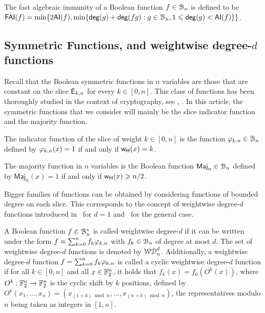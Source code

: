 \documentclass{llncs}
\begin{document}
\begin{definition}\label{def:FAI}
	The fast algebraic immunity of a Boolean function $f\in \mathcal{B}_{n}$ is defined to be $\mathsf{FAI}(f)=\min \{ 2 \mathsf{AI}(f), \min\{\mathsf{deg}(g)+ \mathsf{deg}(fg):g\in\mathcal{B}_n,1\leqslant\mathsf{deg}(g)<\mathsf{AI}(f)\}\}$.
\end{definition}

\subsection{Symmetric Functions, \hwbf{} and weightwise degree-$d$ functions}

Recall that the Boolean symmetric functions in $n$ variables are those that are constant on the slice $\mathsf{E}_{k,n}$ for every $k\in [0,n]$.  This class of functions has been thoroughly studied in the context of cryptography, see \eg, \cite{IEEE:Carlet04,IEEE:CanVid05,INDO:BraPre05,DM:SarMai07,IEEE:QFLW09,IEEE:CheLu11,Latin:Meaux19,CCDS:Meaux21,IEEE:CarMea21}. In this article, the symmetric functions that we consider will mainly be the slice indicator function and the majority function.

\begin{definition}\label{def:slice}
	The indicator function of the slice of weight $k\in[0,n]$ is the function $\varphi_{k,n}\in\mathcal{B}_n$ defined by $\varphi_{k,n}(x)=1$ if and only if $\mathsf{w_H}(x)=k$.
\end{definition}

\begin{definition}\label{def:maj}
    The majority function in $n$ variables is the Boolean function $\mathsf{Maj}_n\in\mathcal{B}_n$ defined by $\mathsf{Maj}_n(x)=1$ if and only if $\mathsf{w_H}(x)\geqslant n/2$.
\end{definition}

Bigger families of functions can be obtained by considering functions of bounded degree on each slice. This corresponds to the concept of weightwise degree-$d$ functions introduced in~\cite{DAM:GinMea22} for $d=1$ and~\cite{DAM:MeaOza24} for the general case. 

\begin{definition}\label{def:wwdegd}
    A Boolean function $f\in\mathcal{B}_n^*$ is called weightwise degree-$d$ if it can be written under the form $f=\sum_{k=0}^n f_k \varphi_{k,n}$ with $f_k\in\mathcal{B}_n$ of degree at most $d$. The set of weightwise degree-$d$ functions is denoted by $\mathcal{WD}^{d}_{n}$. Additionally, a weightwise degree-$d$ function $f=\sum_{k=0}^n f_k \varphi_{k,n}$ is called a cyclic weightwise degree-$d$ function if for all $k\in [0,n]$ and all $x\in\mathbb{F}_2^n$, it holds that $f_k(x)=f_0(O^k(x))$, where $O^k:\mathbb{F}_2^n\to\mathbb{F}_2^n$ is the cyclic shift by $k$ positions, defined by $O^k(x_1,\dots,x_n)=(x_{(1+k)\bmod n},\dots,x_{(n+k)\bmod n})$, the representatives modulo $n$ being taken as integers in $[1,n]$.
\end{definition}
\end{document}
